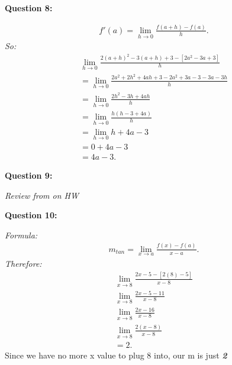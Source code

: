 \documentclass{report}
\begin{document}
    \bigbreak \noindent \bigbreak \noindent \bigbreak \noindent 
    \begin{Large}
        \textbf{Question 8:}
    \end{Large}
    \bigbreak \noindent 
    \bigbreak \noindent 
    \begin{align*}
        f\prime(a) = \lim\limits_{h \to 0}{ \frac{f(a+h) - f(a)}{h}}
    .\end{align*}
    \bigbreak \noindent 
    \textit{So:}
    \begin{align*}
        \lim\limits_{h \to 0}{ \frac{2(a+h)^2-3(a+h)+3-[2a^2-3a+3]}{h}} \\ 
        = \lim\limits_{h \to 0}{\frac{2a^2+2h^2+4ah+3-2a^2+3a-3-3a-3h}{h}} \\
        = \lim\limits_{h \to 0}{\frac{2h^2-3h+4ah}{h}} \\ 
        = \lim\limits_{h \to 0}{\frac{h(h-3+4a)}{h}} \\
        = \lim\limits_{h \to 0}{h+4a-3} \\ 
        = 0+4a-3 \\
        = 4a-3
    .\end{align*}

    \bigbreak \noindent \bigbreak \noindent \bigbreak \noindent 
    \begin{Large}
        \textbf{Question 9:}
    \end{Large}
    \bigbreak \noindent 
    \bigbreak \noindent 
    \textit{Review from on HW}

    \bigbreak \noindent \bigbreak \noindent \bigbreak \noindent 
    \begin{Large}
        \textbf{Question 10:}
    \end{Large}
    \bigbreak \noindent 
    \bigbreak \noindent 
    \textit{Formula:}
    \begin{align*}
        m_{tan} = \lim\limits_{x \to a}{ \frac{f(x) -f(a)}{x-a}}
    .\end{align*}
    \bigbreak \noindent 
    \textit{Therefore:}
    \begin{align*}
        \lim\limits_{x \to 8}{ \frac{2x-5 - [2(8)-5]}{x-8}} \\
        \lim\limits_{x \to 8}{ \frac{2x-5 -11}{x-8}} \\
        \lim\limits_{x \to 8}{ \frac{2x-16}{x-8}} \\
        \lim\limits_{x \to 8}{ \frac{2(x-8)}{x-8}} \\
        = 2
    .\end{align*}
    \bigbreak \noindent 
    Since we have no more x value to plug 8 into, our m is just \textbf{\textit{2}}
    
\end{document}
